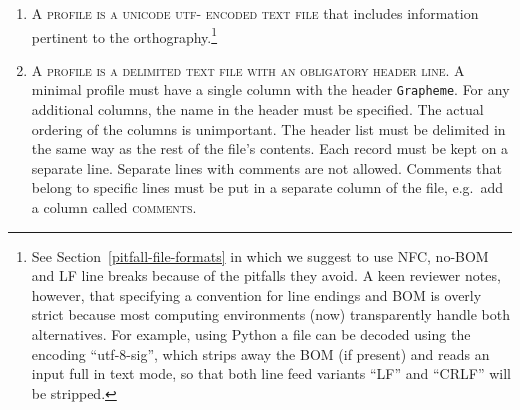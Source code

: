 \begin{enumerate}
	\def\labelenumi{A\arabic{enumi}.} 
	\item \textsc{A profile is a unicode utf-\scalebox{0.8}{8} encoded text file} 
       that includes information pertinent to the orthography.\footnote{See 
	   Section~\ref{pitfall-file-formats} in which we suggest to use NFC, 
	   no-BOM and LF line breaks because of the pitfalls they avoid. A keen reviewer notes, however, that specifying 
	   a convention for line endings and BOM is overly strict because most 
	   computing environments (now) transparently handle both alternatives. 
	   For example, using Python a file can be decoded using the encoding 
	   ``utf-8-sig'', which strips away the BOM (if present) and reads 
	   an input full in text mode, so that both line feed variants ``LF'' and 
	   ``CRLF'' will be stripped.}

	\item \textsc{A profile is a delimited text file with an obligatory header
       line}. A minimal profile must have a single column with the header \texttt{Grapheme}. 
	   For any additional columns, the name in the header 
       must be specified. The actual ordering of the columns is unimportant. 
	   The header list must be delimited 
	   in the same way as the rest of the file's contents. Each record must be kept 
	   on a separate line. Separate lines with comments are not allowed. Comments that
       belong to specific lines must be put in a separate column of
       the file, e.g.~add a column called \textsc{comments}.

\begin{comment}	   
	\item \textsc{Metadata should be added in a separate utf-\scalebox{0.8}{8} text file} using a basic
       \textsc{tag: value} format. Metadata about the orthographic description
       given in the orthography profile includes, minimally, (i) author, (ii)
       date, (iii) title of the profile, (iv) a stable language identifier
       encoded in BCP 47/ISO 639-3 of the target language of the profile, and (v)
       bibliographic data for resource(s) that illustrate the orthography
       described in the profile. Further, (vi) the tokenization method and (vii)
       the Unicode normalization used should be documented here (see below).
\end{comment}


\end{enumerate}
